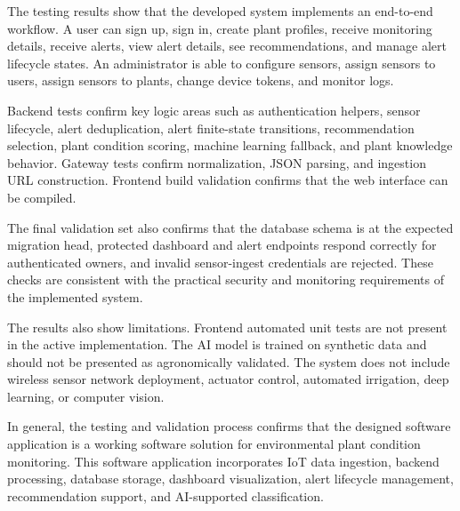 The testing results show that the developed system implements an end-to-end workflow. A user can sign up, sign in, create plant profiles, receive monitoring details, receive alerts, view alert details, see recommendations, and manage alert lifecycle states. An administrator is able to configure sensors, assign sensors to users, assign sensors to plants, change device tokens, and monitor logs.

Backend tests confirm key logic areas such as authentication helpers, sensor lifecycle, alert deduplication, alert finite-state transitions, recommendation selection, plant condition scoring, machine learning fallback, and plant knowledge behavior. Gateway tests confirm normalization, JSON parsing, and ingestion URL construction. Frontend build validation confirms that the web interface can be compiled.

The final validation set also confirms that the database schema is at the expected migration head, protected dashboard and alert endpoints respond correctly for authenticated owners, and invalid sensor-ingest credentials are rejected. These checks are consistent with the practical security and monitoring requirements of the implemented system.

The results also show limitations. Frontend automated unit tests are not present in the active implementation. The AI model is trained on synthetic data and should not be presented as agronomically validated. The system does not include wireless sensor network deployment, actuator control, automated irrigation, deep learning, or computer vision.

In general, the testing and validation process confirms that the designed software application is a working software solution for environmental plant condition monitoring. This software application incorporates IoT data ingestion, backend processing, database storage, dashboard visualization, alert lifecycle management, recommendation support, and AI-supported classification.


